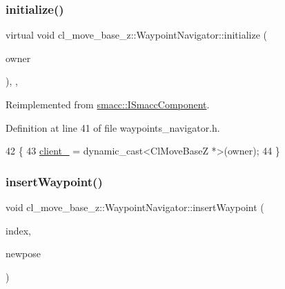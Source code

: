 \subsubsection{\texorpdfstring{initialize()}{initialize()}}
{\footnotesize\ttfamily virtual void cl\+\_\+move\+\_\+base\+\_\+z\+::\+Waypoint\+Navigator\+::initialize (\begin{DoxyParamCaption}\item[{\hyperlink{classsmacc_1_1ISmaccClient}{smacc\+::\+I\+Smacc\+Client} $\ast$}]{owner }\end{DoxyParamCaption})\hspace{0.3cm}{\ttfamily [inline]}, {\ttfamily [override]}, {\ttfamily [virtual]}}



Reimplemented from \hyperlink{classsmacc_1_1ISmaccComponent_a3378552cb1a86aa26a07c0edc057448b}{smacc\+::\+I\+Smacc\+Component}.



Definition at line 41 of file waypoints\+\_\+navigator.\+h.


\begin{DoxyCode}
42   \{
43     \hyperlink{classcl__move__base__z_1_1WaypointNavigator_afc5ad5c5d15f41437286b8fca1d3a324}{client\_} = \textcolor{keyword}{dynamic\_cast<}ClMoveBaseZ *\textcolor{keyword}{>}(owner);
44   \}
\end{DoxyCode}
\mbox{\label{classcl__move__base__z_1_1WaypointNavigator_a5d40e7942620c3c191e2a3bd75845069}} 
\subsubsection{\texorpdfstring{insert\+Waypoint()}{insertWaypoint()}}
{\footnotesize\ttfamily void cl\+\_\+move\+\_\+base\+\_\+z\+::\+Waypoint\+Navigator\+::insert\+Waypoint (\begin{DoxyParamCaption}\item[{int}]{index,  }\item[{geometry\+\_\+msgs\+::\+Pose \&}]{newpose }\end{DoxyParamCaption})}



